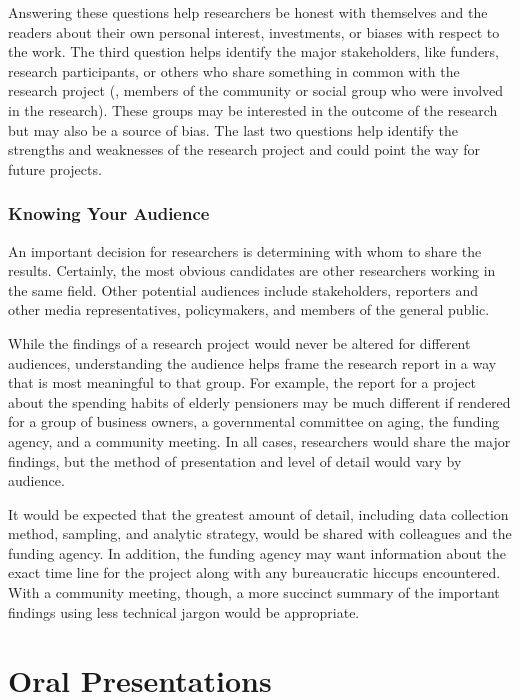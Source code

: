Answering these questions help researchers be honest with themselves and the readers about their own personal interest, investments, or biases with respect to the work. The third question helps identify the major stakeholders, like funders, research participants, or others who share something in common with the research project (\eg, members of the community or social group who were involved in the research). These groups may be interested in the outcome of the research but may also be a source of bias. The last two questions help identify the strengths and weaknesses of the research project and could point the way for future projects.

\subsubsection{Knowing Your Audience}

An important decision for researchers is determining with whom to share the results. Certainly, the most obvious candidates are other researchers working in the same field. Other potential audiences include stakeholders, reporters and other media representatives, policymakers, and members of the general public.

While the findings of a research project would never be altered for different audiences, understanding the audience helps frame the research report in a way that is most meaningful to that group. For example, the report for a project about the spending habits of elderly pensioners may be much different if rendered for a group of business owners, a governmental committee on aging, the funding agency, and a community meeting. In all cases, researchers would share the major findings, but the method of presentation and level of detail would vary by audience.

It would be expected that the greatest amount of detail, including data collection method, sampling, and analytic strategy, would be shared with colleagues and the funding agency. In addition, the funding agency may want information about the exact time line for the project along with any bureaucratic hiccups encountered. With a community meeting, though, a more succinct summary of the important findings using less technical jargon would be appropriate.

\section{Oral Presentations}

